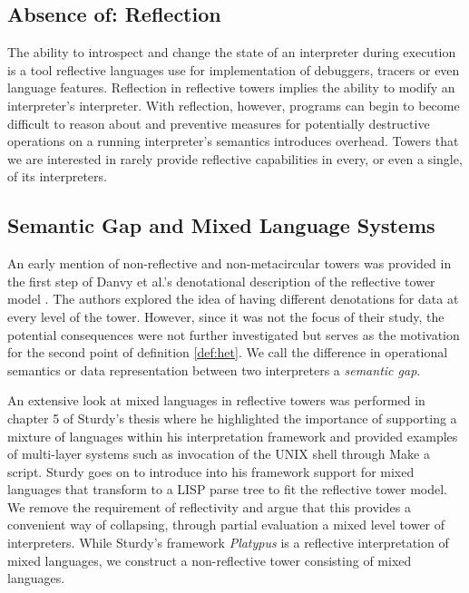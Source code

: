 \documentclass[a4paper,12pt,twoside,openright]{report}
\theoremstyle{definition}
\begin{document}
\subsection{Absence of: Reflection}
The ability to introspect and change the state of an interpreter during execution is a tool reflective languages use for implementation of debuggers, tracers or even language features. Reflection in reflective towers implies the ability to modify an interpreter's interpreter. With reflection, however, programs can begin to become difficult to reason about and preventive measures for potentially destructive operations on a running interpreter's semantics introduces overhead. Towers that we are interested in rarely provide reflective capabilities in every, or even a single, of its interpreters.

\subsection{Semantic Gap and Mixed Language Systems}
An early mention of non-reflective and non-metacircular towers was provided in the first step of Danvy et al.'s denotational description of the reflective tower model \cite{danvy1988intensions}. The authors explored the idea of having different denotations for data at every level of the tower. However, since it was not the focus of their study, the potential consequences were not further investigated but serves as the motivation for the second point of definition \ref{def:het}. We call the difference in operational semantics or data representation between two interpreters a \textit{semantic gap}.

An extensive look at mixed languages in reflective towers was performed in chapter 5 of Sturdy's thesis \cite{sturdy1993lisp} where he highlighted the importance of supporting a mixture of languages within his interpretation framework and provided examples of multi-layer systems such as invocation of the UNIX shell through Make a script. Sturdy goes on to introduce into his framework support for mixed languages that transform to a LISP parse tree to fit the reflective tower model. We remove the requirement of reflectivity and argue that this provides a convenient way of collapsing, through partial evaluation a mixed level tower of interpreters. While Sturdy's framework \textit{Platypus} is a reflective interpretation of mixed languages, we construct a non-reflective tower consisting of mixed languages.
\end{document}
